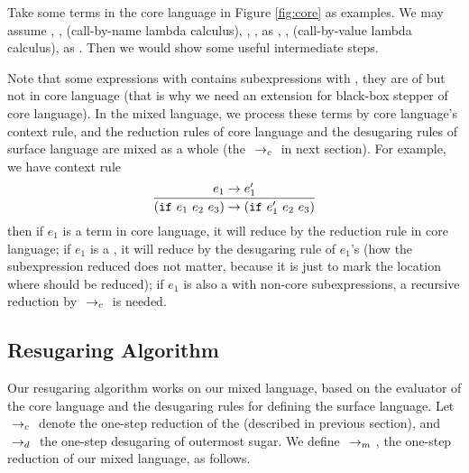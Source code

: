 Take some terms in the core language in Figure \ref{fig:core} as examples.
We may assume , ,  (call-by-name lambda calculus), , ,  as , ,  (call-by-value lambda calculus),  as . Then we would show some useful intermediate steps.

Note that some expressions with  contains subexpressions with , they are of  but not in core language (that is why we need an extension for black-box stepper of core language). In the mixed language, we process these terms by core language's context rule, and the reduction rules of core language and the desugaring rules of surface language are mixed as a whole (the $~\rightarrow_c~$ in next section). For example, we have context rule
\[
\infer{(\m{if}~e_1~e_2~e_3) \rightarrow (\m{if}~e_1'~e_2~e_3)}{e_1 \rightarrow e_1'}
\]
then if $e_1$ is a term in core language, it will reduce by the reduction rule in core language; if $e_1$ is a , it will reduce by the desugaring rule of $e_1$'s  (how the subexpression reduced does not matter, because it is just to mark the location where should be reduced); if $e_1$ is also a  with non-core subexpressions, a recursive reduction by $~\rightarrow_c~$ is needed.


\subsection{Resugaring Algorithm}

Our resugaring algorithm works on our mixed language, based on the evaluator of the core language and the desugaring rules for defining the surface language. Let $~\rightarrow_c~$ denote the one-step reduction of the  (described in previous section), and $~\rightarrow_d~$ the one-step desugaring of outermost sugar. We define $~\rightarrow_m~$, the one-step reduction of our mixed language, as follows.
\label{mark:mixedreduction}
{}
{}
{}
{
}

